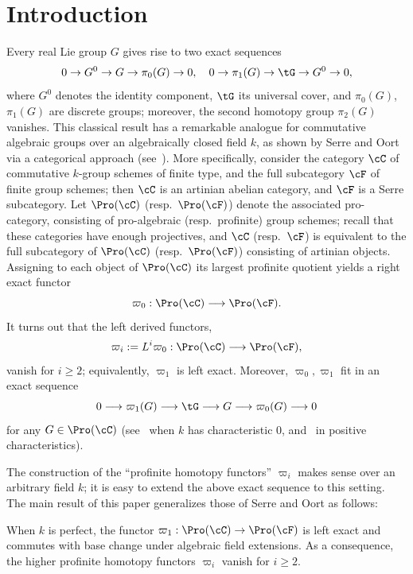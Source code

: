 \section{Introduction}\label{sec:int}

Every real Lie group $G$ gives rise to two exact sequences
\[
0 \to G^0 \to G \to \pi_0(G) \to 0, \quad 0 \to \pi_1(G) \to \tG \to G^0 \to 0,
\]
where $G^0$ denotes the identity component, $\tG$ its universal cover, and $\pi_0(G)$, $\pi_1(G)$ are discrete groups; moreover, the second homotopy group $\pi_2(G)$ vanishes. This classical result has a remarkable analogue for commutative algebraic groups over an algebraically closed field $k$, as shown by Serre and Oort via a categorical approach (see~\cite{Se60,Oort}). More specifically, consider the category $\cC$ of commutative $k$-group schemes of finite type, and the full subcategory $\cF$ of finite group schemes; then $\cC$ is an artinian abelian category, and $\cF$ is a Serre subcategory. Let $\Pro(\cC)$ (resp.~$\Pro(\cF)$) denote the associated pro-category, consisting of pro-algebraic (resp.~profinite) group schemes; recall that these categories have enough projectives, and $\cC$ (resp.~$\cF$) is equivalent to the full subcategory of $\Pro(\cC)$ (resp.~$\Pro(\cF)$) consisting of artinian objects. Assigning to each object of $\Pro(\cC)$ its largest profinite quotient yields a right exact functor
\[
\varpi_0 : \Pro(\cC) \longrightarrow \Pro(\cF).
\]
It turns out that the left derived functors,
\[
\varpi_i := L^i \varpi_0: \Pro(\cC) \longrightarrow \Pro(\cF),
\]
vanish for $i \geq 2$; equivalently, $\varpi_1$ is left exact. Moreover, $\varpi_0, \varpi_1$ fit in an exact sequence
\[
0 \longrightarrow \varpi_1(G) \longrightarrow \tG \longrightarrow G \longrightarrow \varpi_0(G) \longrightarrow 0
\]
for any $G \in \Pro(\cC)$ (see~\cite[6.2, 10.2]{Se60} when $k$ has characteristic $0$, and~\cite[II.7, II.14]{Oort} in positive characteristics).

The construction of the ``profinite homotopy functors'' $\varpi_i$ makes sense over an arbitrary field $k$; it is easy to extend the above exact sequence to this setting. The main result of this paper generalizes those of Serre and Oort as follows:

\begin{theo}\label{thm:funda}
When $k$ is perfect, the functor $\varpi_1 : \Pro(\cC) \to \Pro(\cF)$ is left exact and commutes with base change under algebraic field extensions. As a consequence, the higher profinite homotopy functors $\varpi_i$ vanish for $i \geq 2$.
\end{theo}

